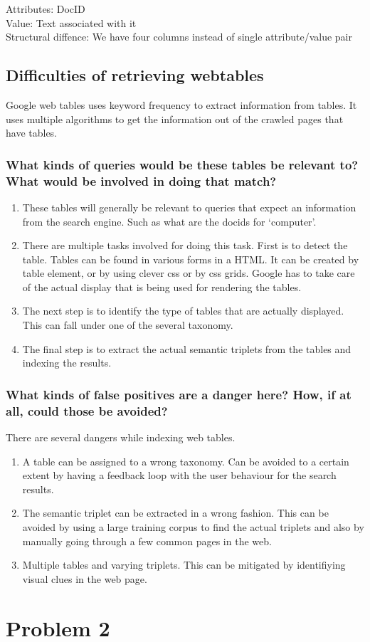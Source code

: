 \documentclass{article}
\begin{document}
\begin{description}
    Attributes: DocID\\
    Value: Text associated with it\\
    Structural diffence:  We have four columns instead of single attribute/value pair
\end{description}

\subsection{Difficulties of retrieving webtables}
Google web tables uses keyword frequency to extract information from tables.  It uses multiple algorithms to get the information out of the crawled pages that have tables.
\subsubsection{What kinds of queries would be these tables be relevant to? What would be involved in doing that match?}
\begin{enumerate}
  \item  These tables will generally be relevant to queries that expect an information from the search engine.  Such as what are the docids for `computer'.
  \item There are multiple tasks involved for doing this task.  First is to detect the table.  Tables can be found in various forms in a HTML\@.  It can be created by table element, or by using clever css  or by css grids.  Google has to take care of the actual display that is being used for rendering the tables.
  \item The next step is to identify the type of tables that are actually displayed.  This can fall under one of the several taxonomy.
  \item The final step is to extract the actual semantic triplets from the tables and indexing the results.
\end{enumerate}

\subsubsection{What kinds of false positives are a danger here? How, if at all, could those be avoided?}
There are several dangers while indexing web tables.
\begin{enumerate}
  \item A table can be assigned to a wrong taxonomy.  Can be avoided to a certain extent by having a feedback loop with the user behaviour for the search results.
  \item The semantic triplet can be extracted in a wrong fashion.  This can be avoided by using a large training corpus to find the actual triplets and also by manually going through a few common pages in the web.
  \item Multiple tables and varying triplets.  This can be mitigated by identifiying visual clues in the web page.
\end{enumerate}


\section{Problem 2}
\end{document}
